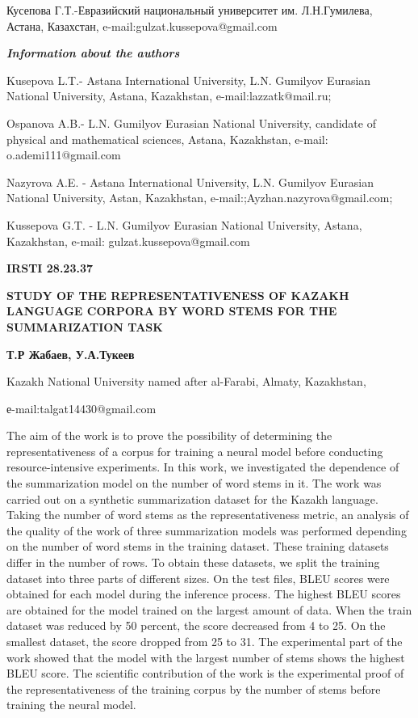 Кусепова Г.Т.-Евразийский национальный университет им. Л.Н.Гумилева,
Астана, Казахстан, e-mail:gulzat.kussepova@gmail.com

\emph{\textbf{Information about the authors}}

Kusepova L.T.- Astana International University, L.N. Gumilyov Eurasian
National University, Astana, Kazakhstan, e-mail:lazzatk@mail.ru;

Ospanova A.B.- L.N. Gumilyov Eurasian National University, candidate of
physical and mathematical sciences, Astana, Kazakhstan, e-mail:
o.ademi111@gmail.com

Nazyrova A.E. - Astana International University, L.N. Gumilyov Eurasian
National University, Astan, Kazakhstan,
e-mail:;Ayzhan.nazyrova@gmail.com;

Kussepova G.T. - L.N. Gumilyov Eurasian National University, Astana,
Kazakhstan, e-mail: gulzat.kussepova@gmail.com

\textbf{IRSTI 28.23.37}

\textbf{STUDY OF THE REPRESENTATIVENESS OF KAZAKH LANGUAGE CORPORA BY
WORD STEMS FOR THE SUMMARIZATION TASK}

\textbf{Т.Р Жабаев, У.А.Тукеев}

Kazakh National University named after al-Farabi, Almaty, Kazakhstan,

е-mail:talgat14430@gmail.com

The aim of the work is to prove the possibility of determining the
representativeness of a corpus for training a neural model before
conducting resource-intensive experiments. In this work, we investigated
the dependence of the summarization model on the number of word stems in
it. The work was carried out on a synthetic summarization dataset for
the Kazakh language. Taking the number of word stems as the
representativeness metric, an analysis of the quality of the work of
three summarization models was performed depending on the number of word
stems in the training dataset. These training datasets differ in the
number of rows. To obtain these datasets, we split the training dataset
into three parts of different sizes. On the test files, BLEU scores were
obtained for each model during the inference process. The highest BLEU
scores are obtained for the model trained on the largest amount of data.
When the train dataset was reduced by 50 percent, the score decreased
from 4 to 25. On the smallest dataset, the score dropped from 25 to 31.
The experimental part of the work showed that the model with the largest
number of stems shows the highest BLEU score. The scientific
contribution of the work is the experimental proof of the
representativeness of the training corpus by the number of stems before
training the neural model.

